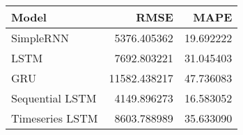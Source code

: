 \begin{tabular}{lrr}
\toprule
Model & RMSE & MAPE \\
\midrule
SimpleRNN & 5376.405362 & 19.692222 \\
LSTM & 7692.803221 & 31.045403 \\
GRU & 11582.438217 & 47.736083 \\
Sequential LSTM & 4149.896273 & 16.583052 \\
Timeseries LSTM & 8603.788989 & 35.633090 \\
\bottomrule
\end{tabular}

